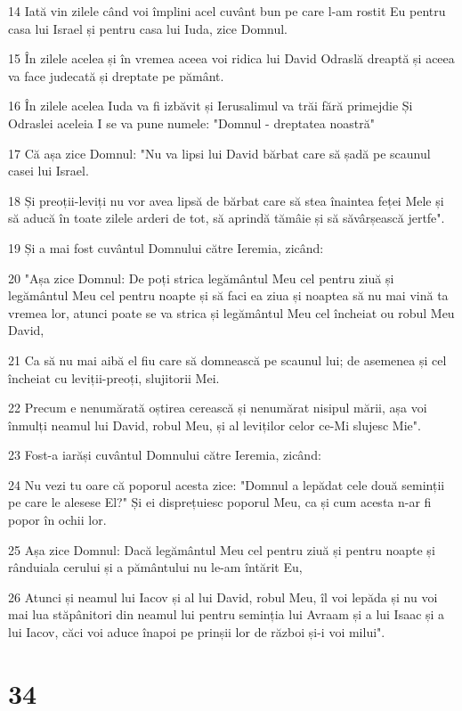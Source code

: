 \par 14 Iată vin zilele când voi împlini acel cuvânt bun pe care l-am rostit Eu pentru casa lui Israel și pentru casa lui Iuda, zice Domnul.
\par 15 În zilele acelea și în vremea aceea voi ridica lui David Odraslă dreaptă și aceea va face judecată și dreptate pe pământ.
\par 16 În zilele acelea Iuda va fi izbăvit și Ierusalimul va trăi fără primejdie Și Odraslei aceleia I se va pune numele: "Domnul - dreptatea noastră"
\par 17 Că așa zice Domnul: "Nu va lipsi lui David bărbat care să șadă pe scaunul casei lui Israel.
\par 18 Și preoții-leviți nu vor avea lipsă de bărbat care să stea înaintea feței Mele și să aducă în toate zilele arderi de tot, să aprindă tămâie și să săvârșească jertfe".
\par 19 Și a mai fost cuvântul Domnului către Ieremia, zicând:
\par 20 "Așa zice Domnul: De poți strica legământul Meu cel pentru ziuă și legământul Meu cel pentru noapte și să faci ea ziua și noaptea să nu mai vină ta vremea lor, atunci poate se va strica și legământul Meu cel încheiat ou robul Meu David,
\par 21 Ca să nu mai aibă el fiu care să domnească pe scaunul lui; de asemenea și cel încheiat cu leviții-preoți, slujitorii Mei.
\par 22 Precum e nenumărată oștirea cerească și nenumărat nisipul mării, așa voi înmulți neamul lui David, robul Meu, și al leviților celor ce-Mi slujesc Mie".
\par 23 Fost-a iarăși cuvântul Domnului către Ieremia, zicând:
\par 24 Nu vezi tu oare că poporul acesta zice: "Domnul a lepădat cele două seminții pe care le alesese El?" Și ei disprețuiesc poporul Meu, ca și cum acesta n-ar fi popor în ochii lor.
\par 25 Așa zice Domnul: Dacă legământul Meu cel pentru ziuă și pentru noapte și rânduiala cerului și a pământului nu le-am întărit Eu,
\par 26 Atunci și neamul lui Iacov și al lui David, robul Meu, îl voi lepăda și nu voi mai lua stăpânitori din neamul lui pentru seminția lui Avraam și a lui Isaac și a lui Iacov, căci voi aduce înapoi pe prinșii lor de război și-i voi milui".

\chapter{34}

